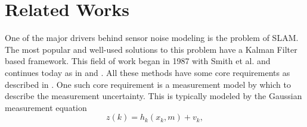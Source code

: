 \section{Related Works}	\label{sec:related_works}  

% 




One of the major drivers behind sensor noise modeling is the problem of
\ac{SLAM}. The most popular and well-used solutions to this problem have a
Kalman Filter based framework. This field of work began in 1987 with Smith et
al. \cite{smith1990estimating} and continues today as in \cite{kaess2008isam}
and \cite{newman2009navigating}. All these methods have some core requirements
as described in \cite{durrant2006simultaneous}. One such core requirement is a
measurement model by which to describe the measurement uncertainty. This is
typically modeled by the Gaussian measurement equation
%
{\setlength\abovedisplayshortskip{-6pt} \setlength\belowdisplayskip{-4pt} %
\begin{equation*}
z(k)=h_k(x_{k},m)+v_k,
\end{equation*}
}
%


